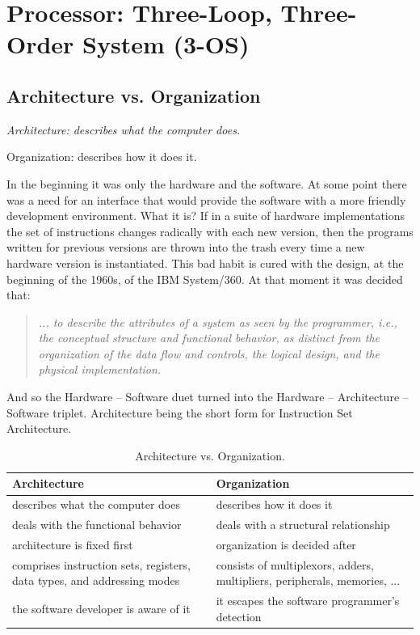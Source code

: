 \section{Processor: Three-Loop, Three-Order System ({\bf 3-OS})}

\subsection{Architecture vs. Organization}

{\small
 \hfill{
\begin{minipage}{8cm}
{\em Architecture: describes what the computer does.

Organization: describes how it does it.}
\end{minipage}
}}

\bigskip
In the beginning it was only the hardware and the software. At some point there was a need for an interface that would provide the software with a more friendly development environment. What it is? If in a suite of hardware implementations the set of instructions changes radically with each new version, then the programs written for previous versions are thrown into the trash every time a new hardware version is instantiated. This bad habit is cured with the design, at the beginning of the 1960s, of the IBM System/360. At that moment it was decided that:
\begin{quote}
{\em ... to describe the
attributes of a system as seen by the programmer, i.e., the conceptual structure
and functional behavior, as distinct from the organization of the data flow and
controls, the logical design, and the physical implementation.} \citep{Amdahl64}
\end{quote}
And so the Hardware -- Software duet turned into the Hardware -- Architecture -- Software triplet. Architecture being the short form for Instruction Set Architecture.
\begin{table}[H]
  \begin{center}
    \caption{Architecture vs. Organization.}
    \label{avso}
    {\small
    \begin{tabular}{|p{6cm}|p{6cm}|}
      \hline
     {\bf Architecture}                 & {\bf Organization}                                \\ \hline \hline
     describes what the computer does   & describes how it does it                          \\ \hline
     deals with the functional behavior & deals with a structural relationship              \\ \hline
     architecture is fixed first        & organization is decided after     \\ \hline
     comprises instruction sets, registers, data types, and addressing modes & consists of  multiplexors, adders, multipliers, peripherals, memories, ...\\ \hline
     the software developer is aware of it & it escapes the software programmer’s detection\\ \hline
    \end{tabular}
    }
  \end{center}
\end{table}


